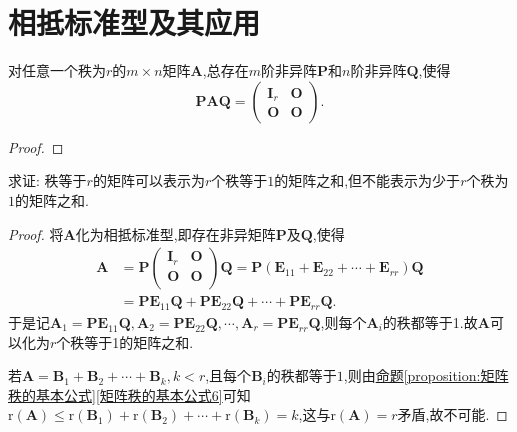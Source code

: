 \documentclass[../../main.tex]{subfiles}
\begin{document}
\section{相抵标准型及其应用}

\begin{theorem}[矩阵的相抵标准型]\label{theorem:矩阵的相抵标准型}
对任意一个秩为\(r\)的\(m\times n\)矩阵\(\boldsymbol{A}\),总存在\(m\)阶非异阵\(\boldsymbol{P}\)和\(n\)阶非异阵\(\boldsymbol{Q}\),使得
\[
\boldsymbol{P}\boldsymbol{A}\boldsymbol{Q}=\begin{pmatrix}
\boldsymbol{I}_r&\boldsymbol{O}\\
\boldsymbol{O}&\boldsymbol{O}
\end{pmatrix}.
\]
\end{theorem}
\begin{proof}

\end{proof}

\begin{proposition}[矩阵的秩1分解]\label{proposition:矩阵的秩1分解}
求证: 秩等于\(r\)的矩阵可以表示为\(r\)个秩等于\(1\)的矩阵之和,但不能表示为少于\(r\)个秩为\(1\)的矩阵之和.
\end{proposition}
\begin{proof}
将\(\boldsymbol{A}\)化为相抵标准型,即存在非异矩阵\(\boldsymbol{P}\)及\(\boldsymbol{Q}\),使得
\begin{align*}
\boldsymbol{A}&=\boldsymbol{P}\left( \begin{matrix}
\boldsymbol{I}_r&		\boldsymbol{O}\\
\boldsymbol{O}&		\boldsymbol{O}\\
\end{matrix} \right) \boldsymbol{Q}=\boldsymbol{P}\left( \boldsymbol{E}_{11}+\boldsymbol{E}_{22}+\cdots +\boldsymbol{E}_{rr} \right) \boldsymbol{Q}
\\
&=\boldsymbol{PE}_{11}\boldsymbol{Q}+\boldsymbol{PE}_{22}\boldsymbol{Q}+\cdots +\boldsymbol{PE}_{rr}\boldsymbol{Q}.
\end{align*}
于是记$\boldsymbol{A}_1=\boldsymbol{PE}_{11}\boldsymbol{Q},\boldsymbol{A}_2=\boldsymbol{PE}_{22}\boldsymbol{Q},\cdots ,\boldsymbol{A}_r=\boldsymbol{PE}_{rr}\boldsymbol{Q}$,则每个$\boldsymbol{A}_i$的秩都等于1.故$\boldsymbol{A}$可以化为$r$个秩等于1的矩阵之和.

若\(\boldsymbol{A}=\boldsymbol{B}_1+\boldsymbol{B}_2+\cdots+\boldsymbol{B}_k,k < r\),且每个\(\boldsymbol{B}_i\)的秩都等于\(1\),则由\hyperref[矩阵秩的基本公式6]{命题\ref{proposition:矩阵秩的基本公式}\ref{矩阵秩的基本公式6}}可知\(\mathrm{r}(\boldsymbol{A})\leq\mathrm{r}(\boldsymbol{B}_1)+\mathrm{r}(\boldsymbol{B}_2)+\cdots+\mathrm{r}(\boldsymbol{B}_k)=k\),这与\(\mathrm{r}(\boldsymbol{A}) = r\)矛盾,故不可能.
\end{proof}
\end{document}
